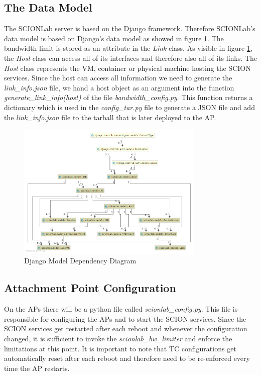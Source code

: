 \subsection{The Data Model}

The \acs{SCIONLab} server is based on the Django framework. Therefore \acs{SCIONLab}'s data model is based on Django's data model as showed in figure \ref{Django Model Dependency Diagram}. The bandwidth limit is stored as an attribute in the \textit{Link} class. As visible in figure \ref{Django Model Dependency Diagram}, the \textit{Host} class can access all of its interfaces and therefore also all of its links. The \textit{Host} class represents the \acs{VM}, container or physical machine hosting the \acs{SCION} services. Since the host can access all information we need to generate the \textit{link\_info.json} file, we hand a host object as an argument into the function \textit{generate\_link\_info(host)} of the file \textit{bandwidth\_config.py}. This function returns a dictionary which is used in the \textit{config\_tar.py} file to generate a \acs{JSON} file and add the \textit{link\_info.json} file to the tarball that is later deployed to the \acl{AP}.

\begin{figure}[H]
	\centering
	\includegraphics[width=0.8\textwidth]{img/Django_diagram.png}
	\caption{Django Model Dependency Diagram}
	\label{Django Model Dependency Diagram}
\end{figure}

\subsection{Attachment Point Configuration}
On the \aclp{AP} there will be a python file called \textit{scionlab\_config.py}. This file is responsible for configuring the \acsp{AP} and to start the \acs{SCION} services. Since the \acs{SCION} services get restarted after each reboot and whenever the configuration changed, it is sufficient to invoke the \textit{scionlab\_bw\_limiter} and enforce the limitations at this point.
It is important to note that \acs{TC} configurations get automatically reset after each reboot and therefore need to be re-enforced every time the \acs{AP} restarts.

